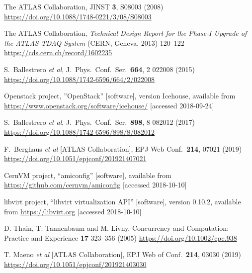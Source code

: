 \documentclass{webofc}
\begin{document}
\begin{thebibliography}{}
   The ATLAS Collaboration,
   JINST \textbf{3}, S08003 (2008)
   \url{https://doi.org/10.1088/1748-0221/3/08/S08003} %

    The ATLAS Collaboration, \textit{Technical Design Report for the Phase-I
    Upgrade of the ATLAS TDAQ System} (CERN, Geneva, 2013) 120--122
    \url{https://cds.cern.ch/record/1602235}

    S.~Ballestrero \textit{et al},
    J.\ Phys.\ Conf.\ Ser.\  \textbf{664}, 2 022008 (2015)
    \url{https://doi.org/10.1088/1742-6596/664/2/022008} %

    Openstack project, ”OpenStack” [software], version Icehouse, available from
    \url{https://www.openstack.org/software/icehouse/} [accessed 2018-09-24] %

    S.~Ballestrero \textit{et al},
    J.\ Phys.\ Conf.\ Ser.\  \textbf{898},  8 082012 (2017)
    \url{https://doi.org/10.1088/1742-6596/898/8/082012} %

    F.~Berghaus \textit{et al} [ATLAS Collaboration],
    EPJ Web Conf.\ \textbf{214}, 07021 (2019)
    \url{https://doi.org/10.1051/epjconf/201921407021}

    CernVM project, ``amiconfig'' [software], available from
    \url{https://github.com/cernvm/amiconfig} [accessed 2018-10-10] %

    libvirt project, ``libvirt virtualization API'' [software], version 0.10.2,
    available from \url{https://libvirt.org} [accessed 2018-10-10] %

    D. Thain, T. Tannenbaum and M. Livny,
    Concurrency and Computation: Practice and Experience \textbf{17} 323--356
    (2005)
    \url{https://doi.org/10.1002/cpe.938}

    T. Maeno \textit{et al} [ATLAS Collaboration],
    EPJ Web of Conf.\ \textbf{214}, 03030 (2019)
    \url{https://doi.org/10.1051/epjconf/201921403030}


\end{thebibliography}
\end{document}
